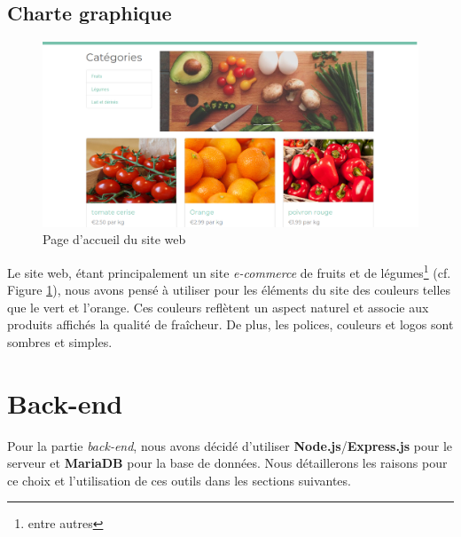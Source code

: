 \documentclass[a4paper,12pt]{report}
\theoremstyle{break}
\theoremstyle{break}
\theoremstyle{break}
\theoremstyle{break}
\theoremstyle{definition}
\theoremstyle{remark}
\begin{document}
\subsection{Charte graphique}
\begin{figure}[!ht]
  \centering
  \includegraphics[scale=0.3]{images/accueil.png}
  \caption{Page d'accueil du site web}
  \label{fig:page_accueil}
\end{figure}

Le site web, étant principalement un site \textit{e-commerce} de fruits et de légumes\footnote{entre autres} (cf. Figure \ref{fig:page_accueil}), nous avons pensé à utiliser pour les éléments du site des couleurs telles que le vert et l'orange. Ces couleurs reflètent un aspect naturel et associe aux produits affichés la qualité de fraîcheur. De plus, les polices, couleurs et logos sont sombres et simples.
\section{Back-end}
Pour la partie \textit{back-end}, nous avons décidé d'utiliser \textbf{Node.js}/\textbf{Express.js} pour le serveur et \textbf{MariaDB} pour la base de données. Nous détaillerons les raisons pour ce choix et l'utilisation de ces outils dans les sections suivantes.
\end{document}
